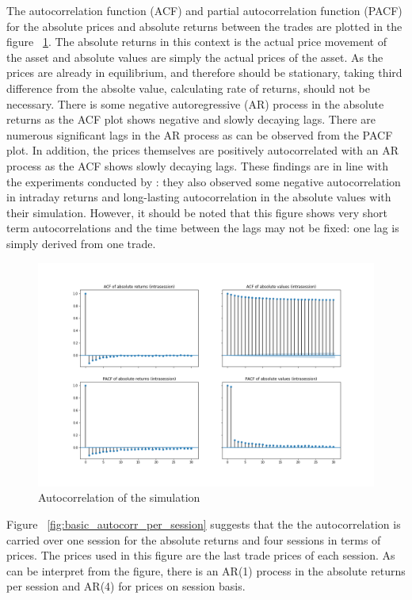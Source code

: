 The autocorrelation function (ACF) and partial autocorrelation function (PACF) for the absolute prices and absolute returns between
the trades are plotted in the figure ~\ref{fig:basic_autocorr}. The absolute returns in this context is the actual price movement of 
the asset and absolute values are simply the actual prices of the asset. As the prices are already in equilibrium, and therefore should be 
stationary, taking third difference from the absolte value, calculating rate of returns, should not be necessary. There is some negative 
autoregressive (AR) process in the absolute returns as the ACF plot shows negative and slowly decaying lags. There are numerous 
significant lags in the AR process as can be observed from the PACF plot. In addition, the prices themselves are 
positively autocorrelated with an AR process as the ACF shows slowly decaying lags. These findings are in line with the experiments conducted by \citet{Raberto05}: 
they also observed some negative autocorrelation in intraday returns and long-lasting autocorrelation in the absolute
values with their simulation. However, it should be noted that this figure shows very short term
autocorrelations and the time between the lags may not be fixed: one lag is simply derived from one
trade. 


\begin{figure}
    \includegraphics[width=\linewidth]{plots/basic_autocorrelation_intra.png}
    \caption{Autocorrelation of the simulation}
    \label{fig:basic_autocorr}
\end{figure}

Figure ~\ref{fig:basic_autocorr_per_session} suggests that the the autocorrelation is carried over one
session for the absolute returns and four sessions in terms of prices. The prices used in this figure are 
the last trade prices of each session. As can be interpret from the figure, there is an AR(1) process in 
the absolute returns per session and AR(4) for prices on session basis.

